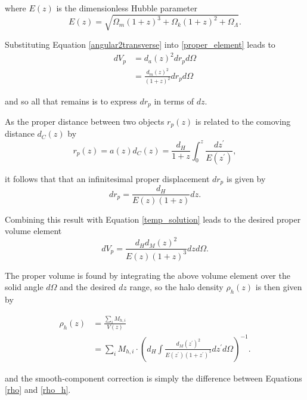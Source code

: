 \documentclass[%
 reprint,
 amsmath,amssymb,
 aps,nofootinbib
]{revtex4-1}
\begin{document}
\noindent where $E(z)$ is the dimensionless Hubble parameter
\begin{equation}\label{dim_hubble_parameter}
E(z)=\sqrt{\Omega_m(1+z)^3+\Omega_k(1+z)^2+\Omega_\Lambda}.
\end{equation}

\noindent Substituting Equation \eqref{angular2transverse} into \eqref{proper_element} leads to
\begin{align}\label{temp_solution}
dV_p&=d_a(z)^2dr_pd\Omega\nonumber\\
&=\frac{d_m(z)^2}{(1+z)^2}dr_pd\Omega
\end{align}

\noindent and so all that remains is to express $dr_p$ in terms of $dz$.

As the proper distance between two objects $r_p(z)$ is related to the comoving distance $d_C(z)$ by
\begin{equation}\label{physical2comoving}
r_p(z)=a(z)d_C(z)=\frac{d_H}{1+z}\int_0^z\frac{dz^\prime}{E(z^\prime)},
\end{equation}

\noindent it follows that that an infinitesimal proper displacement $dr_p$ is given by
\begin{equation}\label{physical2comoving_inf}
dr_p=\frac{d_H}{E(z)(1+z)}dz.
\end{equation}

\noindent Combining this result with Equation \eqref{temp_solution} leads to the desired proper volume element
\begin{equation}\label{pvolume_element}
dV_p=\frac{d_Hd_M(z)^2}{E(z)(1+z)^3}dzd\Omega.
\end{equation}

The proper volume is found by integrating the above volume element over the solid angle $d\Omega$ and the desired $dz$ range, so the halo density $\rho_h(z)$ is then given by

\begin{align}\label{rho_h}
\rho_h(z)&=\frac{\sum_i M_{h,i}}{V(z)}\nonumber\\
&=\sum_i M_{h,i}\cdot\left(d_H\int\frac{d_M(z^\prime)^2}{E(z^\prime)(1+z^\prime)^3}dz^\prime d\Omega\right)^{-1}.
\end{align}

\noindent and the smooth-component correction is simply the difference between Equations \eqref{rho} and \eqref{rho_h}.

\end{document}
